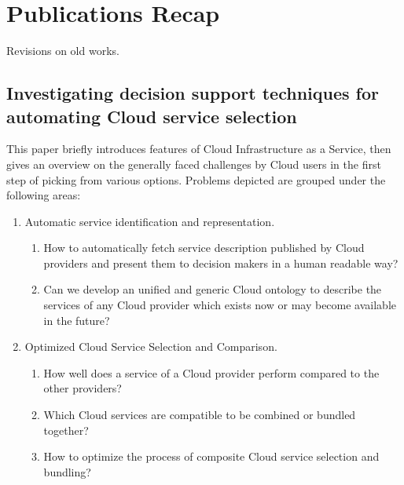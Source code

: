 \chapter{Publications Recap}
Revisions on old works.

\section{Investigating decision support techniques for automating Cloud service selection}
\label{paper:proposal}
This paper briefly introduces features of Cloud Infrastructure as a Service, then gives an overview on the generally faced challenges by Cloud users in the first step of picking from various options. Problems depicted are grouped under the following areas:

\begin{enumerate}
	
  \item \label{itm:service_identification_representation}
  Automatic service identification and representation.   
  
  \begin{enumerate}[label*=\arabic*.]
  
    \item \label{itm:service_discovery} 
    How to automatically fetch service description published by Cloud providers and present them to decision makers in a human readable way?
    \item \label{itm:ontology}
    Can we develop an unified and generic Cloud ontology to describe the services of any Cloud provider which exists now or may become available in the future?
  \end{enumerate}
  
  \item \label{itm:selection_comparison}
  Optimized Cloud Service Selection and Comparison.
  
  \begin{enumerate}[label*=\arabic*.]
    \item \label{itm:comparison}
    How well does a service of a Cloud provider perform compared to the other providers? 
    \item \label{itm:compatibility}
    Which Cloud services are compatible to be combined or bundled together?
    \item \label{composition}
    How to optimize the process of composite Cloud service selection and bundling?
  \end{enumerate}  
  

\end{enumerate}
